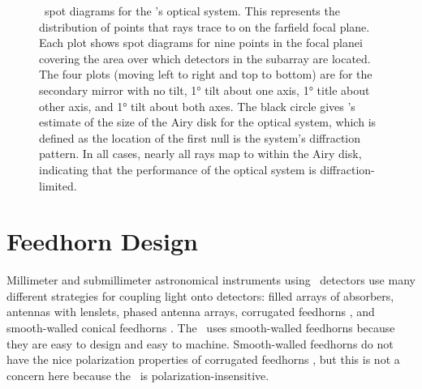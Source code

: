 \begin{figure}[th]
\begin{tabular}{lr}
\end{tabular}
\caption{
\ZEMAX\ spot diagrams for the \Imager's optical system.
This represents the distribution of points that rays trace to on the farfield focal plane.
Each plot shows spot diagrams for nine points in the focal planei covering the area over which detectors in the subarray are located.
The four plots (moving left to right and top to bottom) are for the secondary mirror with no tilt, \ang{1} tilt about one axis, \ang{1} title about other axis, and \ang{1} tilt about both axes.
The black circle gives \ZEMAX's estimate of the size of the Airy disk for the optical system, which is defined as the location of the first null is the system's diffraction pattern.
In all cases, nearly all rays map to within the Airy disk, indicating that the performance of the optical system is diffraction-limited.
}
\label{fig:ch4-spot-diagrams}
\end{figure}


\section{Feedhorn Design}\label{sec:ch4-feedhorn-design}


Millimeter and submillimeter astronomical instruments using \TES\ detectors use many different strategies for coupling light onto detectors: filled arrays of absorbers\cite{swetz_overview_2011,holland_scuba-2:_2013}, antennas with lenslets\cite{keating_ultra_2011}, phased antenna arrays\cite{obrient_antenna-coupled_2012}, corrugated feedhorns \cite{austermann_sptpol:_2012,niemack_actpol:_2010}, and smooth-walled conical feedhorns \cite{schwan_invited_2011,spt}.
The \Imager\ uses smooth-walled feedhorns because they are easy to design and easy to machine.
Smooth-walled feedhorns do not have the nice polarization properties of corrugated feedhorns \cite{clarricoats_corrugated_1984}, but this is not a concern here because the \Imager\ is polarization-insensitive.

